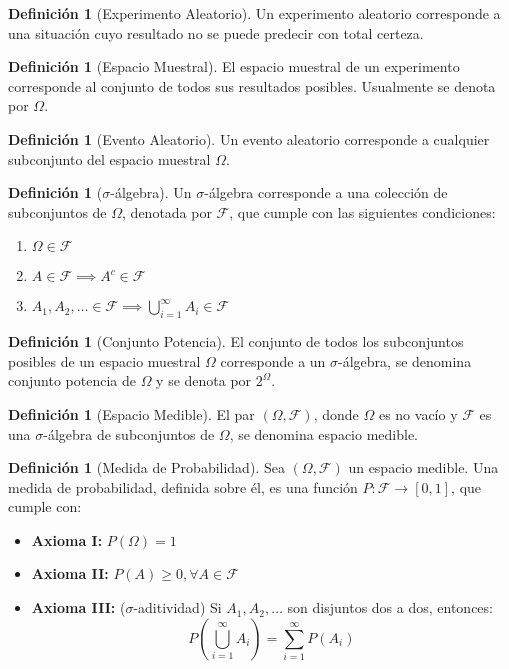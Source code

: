 \documentclass[11pt]{article}
\theoremstyle{definition} %
\newtheorem{definition}[theorem]{Definición}
\begin{document}
\begin{definition}[Experimento Aleatorio]
Un experimento aleatorio corresponde a una situación cuyo resultado no se puede predecir con total certeza.
\end{definition}

\begin{definition}[Espacio Muestral]
El espacio muestral de un experimento corresponde al conjunto de todos sus resultados posibles. Usualmente se denota por $\Omega$.
\end{definition}

\begin{definition}[Evento Aleatorio]
Un evento aleatorio corresponde a cualquier subconjunto del espacio muestral $\Omega$.
\end{definition}

\begin{definition}[$\sigma$-álgebra]
Un $\sigma$-álgebra corresponde a una colección de subconjuntos de $\Omega$, denotada por $\mathcal{F}$, que cumple con las siguientes condiciones:
\begin{enumerate}
    \item $\Omega \in \mathcal{F}$
    \item $A \in \mathcal{F} \implies A^{c} \in \mathcal{F}$
    \item $A_{1}, A_{2}, \dots \in \mathcal{F} \implies \bigcup_{i=1}^{\infty} A_{i} \in \mathcal{F}$
\end{enumerate}
\end{definition}

\begin{definition}[Conjunto Potencia]
El conjunto de todos los subconjuntos posibles de un espacio muestral $\Omega$ corresponde a un $\sigma$-álgebra, se denomina conjunto potencia de $\Omega$ y se denota por $2^{\Omega}$.
\end{definition}

\begin{definition}[Espacio Medible]
El par $(\Omega, \mathcal{F})$, donde $\Omega$ es no vacío y $\mathcal{F}$ es una $\sigma$-álgebra de subconjuntos de $\Omega$, se denomina espacio medible.
\end{definition}

\begin{definition}[Medida de Probabilidad]
Sea $(\Omega, \mathcal{F})$ un espacio medible. Una medida de probabilidad, definida sobre él, es una función $P: \mathcal{F} \longrightarrow [0,1]$, que cumple con:
\begin{itemize}
    \item \textbf{Axioma I:} $P(\Omega) = 1$
    \item \textbf{Axioma II:} $P(A) \ge 0, \forall A \in \mathcal{F}$
    \item \textbf{Axioma III:} ($\sigma$-aditividad) Si $A_{1}, A_{2}, \dots$ son disjuntos dos a dos, entonces:
    $$ P\left(\bigcup_{i=1}^{\infty} A_{i}\right) = \sum_{i=1}^{\infty} P(A_{i}) $$
\end{itemize}
\end{definition}
\end{document}
